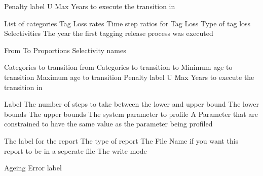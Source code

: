  {Penalty label}
 {U Max}
 {Years to execute the transition in}
 {}
 {}
 {}
 {}
\par\textbf{}\par
{} {List of categories}
 {Tag Loss rates}
 {Time step ratios for Tag Loss}
 {Type of tag loss}
 {Selectivities}
 {The year the first tagging release process was executed}
\par\textbf{}\par
{} {From}
 {To}
 {Proportions}
 {Selectivity names}
\par\textbf{}\par
{} {Categories to transition from}
 {Categories to transition to}
 {Minimum age to transition}
 {Maximum age to transition}
 {Penalty label}
 {U Max}
 {Years to execute the transition in}
\par\par
{} {Label}
 {The number of steps to take between the lower and upper bound}
 {The lower bounds}
 {The upper bounds}
 {The system parameter to profile}
 {A Parameter that are constrained to have the same value as the parameter being profiled}
\par\par
{} {The label for the report}
 {The type of report}
 {The File Name if you want this report to be in a seperate file}
 {The write mode}
\par\textbf{}\par
{} {Ageing Error label}
\par\textbf{}\par
\par\textbf{}\par
